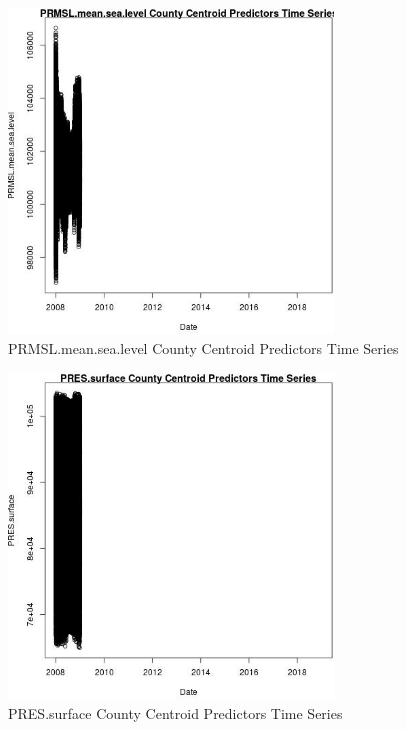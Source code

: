 \begin{figure} 
\centering  
\includegraphics[width=0.77\textwidth]{Code_Outputs/df_report_ML_predictors_CountyCentroid_Locations_Dates_2008-01-01to2018-12-31_PRMSLmeansealevelvDate.jpg} 
\caption{\label{fig:df_report_ML_predictors_CountyCentroid_Locations_Dates_2008-01-01to2018-12-31PRMSLmeansealevelvDate}PRMSL.mean.sea.level County Centroid Predictors Time Series} 
\end{figure} 
 

\begin{figure} 
\centering  
\includegraphics[width=0.77\textwidth]{Code_Outputs/df_report_ML_predictors_CountyCentroid_Locations_Dates_2008-01-01to2018-12-31_PRESsurfacevDate.jpg} 
\caption{\label{fig:df_report_ML_predictors_CountyCentroid_Locations_Dates_2008-01-01to2018-12-31PRESsurfacevDate}PRES.surface County Centroid Predictors Time Series} 
\end{figure} 
 

